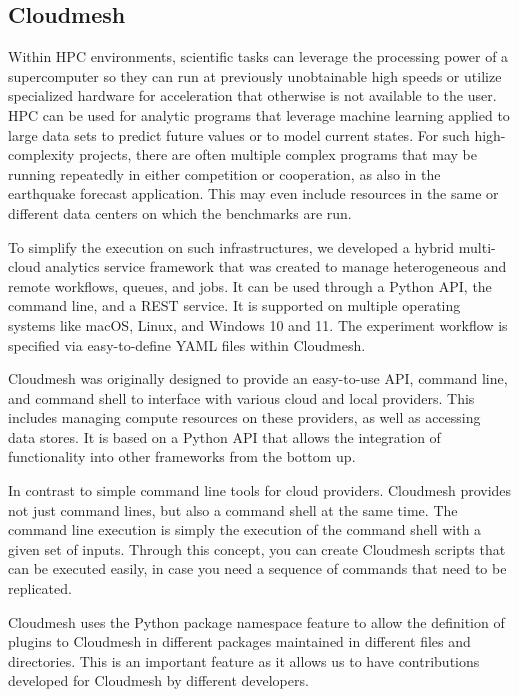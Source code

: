 \documentclass[utf8]{FrontiersinVancouver} %
\begin{document}
\subsection{Cloudmesh}


Within HPC environments, scientific tasks can leverage the processing power of a supercomputer so they can run at previously unobtainable high speeds or utilize specialized hardware for acceleration that otherwise is not available to the user. HPC can be used for analytic programs that leverage machine learning applied to large data sets to predict future values or to model current states. For such high-complexity projects, there are often multiple complex programs that may be running repeatedly in either competition or cooperation, as also in the earthquake forecast application.  This may even include resources in the same or different data centers on which the benchmarks are run. 

To simplify the execution on such infrastructures, we developed a hybrid multi-cloud analytics service framework that was created to manage heterogeneous and remote workflows, queues, and jobs.  It can be used through a Python API, the command line, and a REST service. It is supported on multiple operating systems like macOS, Linux, and Windows 10 and 11.  The experiment workflow is specified via easy-to-define YAML files within Cloudmesh.  

Cloudmesh was originally designed to provide an easy-to-use API, command line, and command shell to interface with various cloud and local providers. This includes managing compute resources on these providers, as well as accessing data stores. It is based on a Python API that allows the integration of functionality into other frameworks from the bottom up. 

In contrast to simple command line tools for cloud providers. Cloudmesh provides not just command lines, but also a command shell at the same time. The command line execution is simply the execution of the command shell with a given set of inputs. Through this concept, you can create Cloudmesh scripts that can be executed easily, in case you need a sequence of commands that need to be replicated.

Cloudmesh uses the Python package namespace feature to allow the definition of plugins to Cloudmesh in different packages maintained in different files and directories. This is an important feature as it allows us to have contributions developed for Cloudmesh by different developers.
\end{document}
